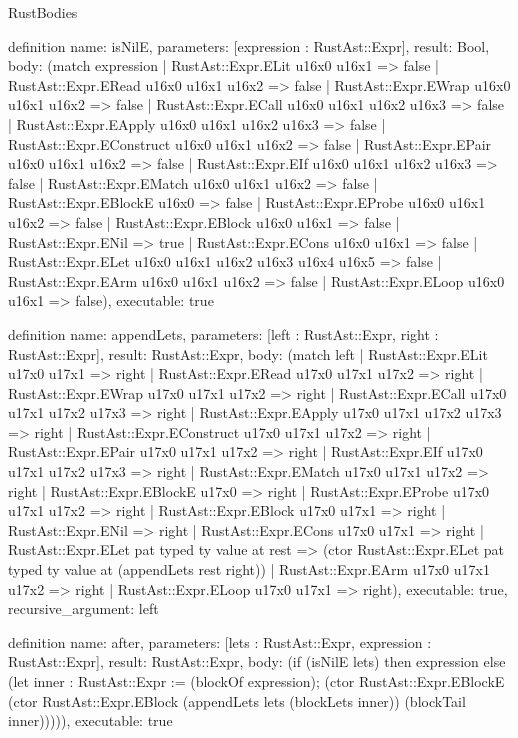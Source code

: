 \begin{lexlean}{RustBodies}
\begin{semanticmodule}
definition{
  name: isNilE,
  parameters: [expression : RustAst::Expr],
  result: Bool,
  body: (match expression
    | RustAst::Expr.ELit u16x0 u16x1 => false
    | RustAst::Expr.ERead u16x0 u16x1 u16x2 => false
    | RustAst::Expr.EWrap u16x0 u16x1 u16x2 => false
    | RustAst::Expr.ECall u16x0 u16x1 u16x2 u16x3 => false
    | RustAst::Expr.EApply u16x0 u16x1 u16x2 u16x3 => false
    | RustAst::Expr.EConstruct u16x0 u16x1 u16x2 => false
    | RustAst::Expr.EPair u16x0 u16x1 u16x2 => false
    | RustAst::Expr.EIf u16x0 u16x1 u16x2 u16x3 => false
    | RustAst::Expr.EMatch u16x0 u16x1 u16x2 => false
    | RustAst::Expr.EBlockE u16x0 => false
    | RustAst::Expr.EProbe u16x0 u16x1 u16x2 => false
    | RustAst::Expr.EBlock u16x0 u16x1 => false
    | RustAst::Expr.ENil => true
    | RustAst::Expr.ECons u16x0 u16x1 => false
    | RustAst::Expr.ELet u16x0 u16x1 u16x2 u16x3 u16x4 u16x5 => false
    | RustAst::Expr.EArm u16x0 u16x1 u16x2 => false
    | RustAst::Expr.ELoop u16x0 u16x1 => false),
  executable: true
}

definition{
  name: appendLets,
  parameters: [left : RustAst::Expr, right : RustAst::Expr],
  result: RustAst::Expr,
  body: (match left
    | RustAst::Expr.ELit u17x0 u17x1 => right
    | RustAst::Expr.ERead u17x0 u17x1 u17x2 => right
    | RustAst::Expr.EWrap u17x0 u17x1 u17x2 => right
    | RustAst::Expr.ECall u17x0 u17x1 u17x2 u17x3 => right
    | RustAst::Expr.EApply u17x0 u17x1 u17x2 u17x3 => right
    | RustAst::Expr.EConstruct u17x0 u17x1 u17x2 => right
    | RustAst::Expr.EPair u17x0 u17x1 u17x2 => right
    | RustAst::Expr.EIf u17x0 u17x1 u17x2 u17x3 => right
    | RustAst::Expr.EMatch u17x0 u17x1 u17x2 => right
    | RustAst::Expr.EBlockE u17x0 => right
    | RustAst::Expr.EProbe u17x0 u17x1 u17x2 => right
    | RustAst::Expr.EBlock u17x0 u17x1 => right
    | RustAst::Expr.ENil => right
    | RustAst::Expr.ECons u17x0 u17x1 => right
    | RustAst::Expr.ELet pat typed ty value at rest => (ctor RustAst::Expr.ELet pat typed ty value at (appendLets rest right))
    | RustAst::Expr.EArm u17x0 u17x1 u17x2 => right
    | RustAst::Expr.ELoop u17x0 u17x1 => right),
  executable: true,
  recursive_argument: left
}

definition{
  name: after,
  parameters: [lets : RustAst::Expr, expression : RustAst::Expr],
  result: RustAst::Expr,
  body: (if (isNilE lets) then expression else (let inner : RustAst::Expr := (blockOf expression); (ctor RustAst::Expr.EBlockE (ctor RustAst::Expr.EBlock (appendLets lets (blockLets inner)) (blockTail inner))))),
  executable: true
}


\end{semanticmodule}
\end{lexlean}
